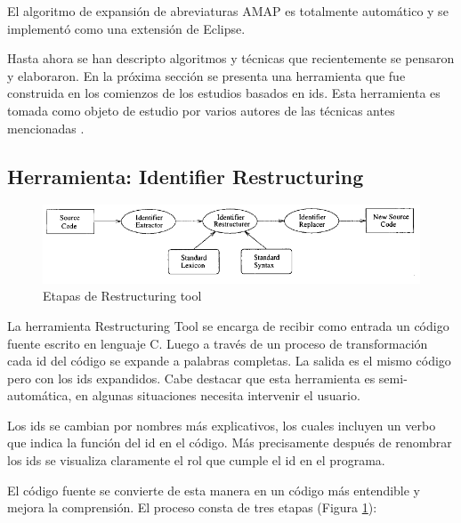 \documentclass[a4paper,12pt]{report}
\begin{document}
El algoritmo de expansión de abreviaturas AMAP es totalmente automático y se implementó como una extensión de Eclipse. %

Hasta ahora se han descripto algoritmos y técnicas que recientemente se pensaron y elaboraron. En la próxima sección se presenta una herramienta que fue construida en los comienzos de los estudios basados en ids. Esta herramienta es tomada como objeto de estudio por varios autores de las técnicas antes mencionadas \cite{EZH08,DCHD06,DLHD06,LFBEX07}.


\pagebreak 
\subsection{Herramienta: Identifier Restructuring}

\begin{figure}[h] %
\centerline{%
\includegraphics[scale= 0.80]{./ire_1.png}
}
\caption{Etapas de Restructuring tool}
\label{ire1}
\end{figure}

La herramienta Restructuring Tool \cite{BCPT00} se encarga de recibir como entrada un código fuente escrito en lenguaje C. Luego a través de un proceso de transformación cada id del código se expande a palabras completas. La salida es el mismo código pero con los ids expandidos.
Cabe destacar que esta herramienta es semi-automática, en algunas situaciones necesita intervenir el usuario.

Los ids se cambian por nombres más explicativos, los cuales incluyen un verbo que indica la función del id en el código. Más precisamente después de renombrar los ids se visualiza claramente el rol que cumple el id en el programa.

El código fuente se convierte de esta manera en un código más entendible y mejora la comprensión. El proceso consta de tres etapas (Figura \ref{ire1}): 
\end{document}
